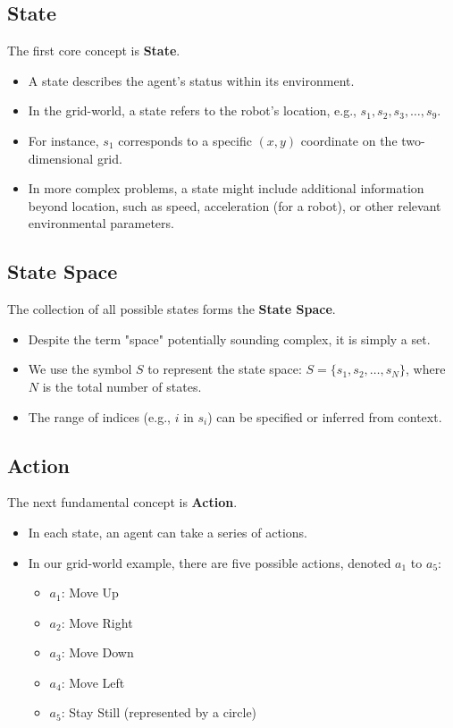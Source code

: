\documentclass{article}
\begin{document}
\subsection*{State}
The first core concept is \textbf{State}.
\begin{itemize}[noitemsep]
    \item A state describes the agent's status within its environment.
    \item In the grid-world, a state refers to the robot's location, e.g., $s_1, s_2, s_3, \dots, s_9$.
    \item For instance, $s_1$ corresponds to a specific $(x, y)$ coordinate on the two-dimensional grid.
    \item In more complex problems, a state might include additional information beyond location, such as speed, acceleration (for a robot), or other relevant environmental parameters.
\end{itemize}

\subsection*{State Space}
The collection of all possible states forms the \textbf{State Space}.
\begin{itemize}[noitemsep]
    \item Despite the term "space" potentially sounding complex, it is simply a set.
    \item We use the symbol $S$ to represent the state space: $S = \{s_1, s_2, \dots, s_N\}$, where $N$ is the total number of states.
    \item The range of indices (e.g., $i$ in $s_i$) can be specified or inferred from context.
\end{itemize}

\subsection*{Action}
The next fundamental concept is \textbf{Action}.
\begin{itemize}[noitemsep]
    \item In each state, an agent can take a series of actions.
    \item In our grid-world example, there are five possible actions, denoted $a_1$ to $a_5$:
        \begin{itemize}[noitemsep]
            \item $a_1$: Move Up
            \item $a_2$: Move Right
            \item $a_3$: Move Down
            \item $a_4$: Move Left
            \item $a_5$: Stay Still (represented by a circle)
        \end{itemize}
\end{itemize}
\end{document}
